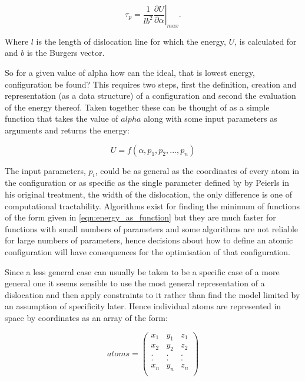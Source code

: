 \begin{equation}
\tau_p = \frac{1}{lb^2}   \left. \frac{\partial U}{\partial \alpha} \right|_{max} .
\end{equation}

Where $l$ is the length of dislocation line for which the energy, $U$, is calculated for and $b$ is the Burgers vector.

So for a given value of alpha how can the ideal, that is lowest energy, configuration be found? This requires two steps, first the definition, creation and representation (as a data structure) of a configuration and second the evaluation of the energy thereof.
Taken together these can be thought of as a simple function that takes the value of $alpha$ along with some input parameters as arguments and returns the energy:

\begin{equation}
U = f(\alpha, p_1, p_2,...,p_n )
\label{eqn:energy_as_function}
\end{equation}

The input parameters, $p_i$, could be as general as the coordinates of every atom in the configuration or as specific as the single parameter defined by by Peierls in his original treatment, the width of the dislocation, the only difference is one of computational tractability. Algorithms exist for finding the minimum of functions of the form given in \autoref{eqn:energy_as_function} but they are much faster for functions with small numbers of parameters and some algorithms are not reliable for large numbers of parameters, hence decisions about how to define an atomic configuration will have consequences for the optimisation of that configuration.

Since a less general case can usually be taken to be a specific case of a more general one it seems sensible to use the most general representation of a dislocation and then apply constraints to it rather than find the model limited by an assumption of specificity later. Hence individual atoms are represented in space by coordinates as an array of the form:

$$ atoms = \begin{pmatrix}
x_1 & y_1 & z_1  \\
x_2 & y_2 & z_2  \\
.   &.    &.     \\
.   &.    &.     \\
x_n & y_n & z_n  \\
\end{pmatrix}
$$

